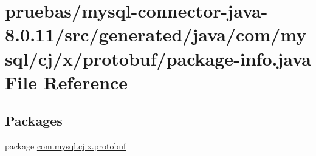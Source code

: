 \hypertarget{generated_2java_2com_2mysql_2cj_2x_2protobuf_2package-info_8java}{}\section{pruebas/mysql-\/connector-\/java-\/8.0.11/src/generated/java/com/mysql/cj/x/protobuf/package-\/info.java File Reference}
\label{generated_2java_2com_2mysql_2cj_2x_2protobuf_2package-info_8java}
\subsection*{Packages}
\begin{DoxyCompactItemize}
\item 
package \mbox{\hyperlink{namespacecom_1_1mysql_1_1cj_1_1x_1_1protobuf}{com.\+mysql.\+cj.\+x.\+protobuf}}
\end{DoxyCompactItemize}
